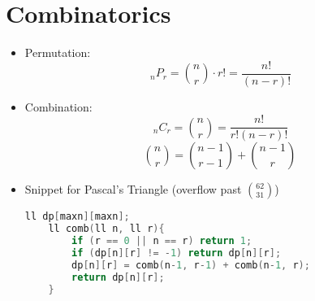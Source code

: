 \documentclass[11pt]{article}
\newcommand{\nCr}[2]{\,_{#1}C_{#2}}
\newcommand{\nPr}[2]{\,_{#1}P_{#2}}
\begin{document}
\section{Combinatorics}
\begin{itemize}
	\item Permutation:
	$$\nPr{n}{r} = \binom{n}{r}\cdot r! = \frac{n!}{(n-r)!} $$
	\item Combination:
	$$\nCr{n}{r} = \binom{n}{r} = \frac{n!}{r!(n-r)!} $$
	$$\binom{n}{r} = \binom{n-1}{r-1}+\binom{n-1}{r} $$
	\item Snippet for Pascal's Triangle (overflow past $\binom{62}{31}$)
	\begin{lstlisting}[language=C++]
	ll dp[maxn][maxn];
	ll comb(ll n, ll r){
		if (r == 0 || n == r) return 1;
		if (dp[n][r] != -1) return dp[n][r];
		dp[n][r] = comb(n-1, r-1) + comb(n-1, r);
		return dp[n][r];
	}\end{lstlisting}
% 
\end{itemize}
\end{document}
